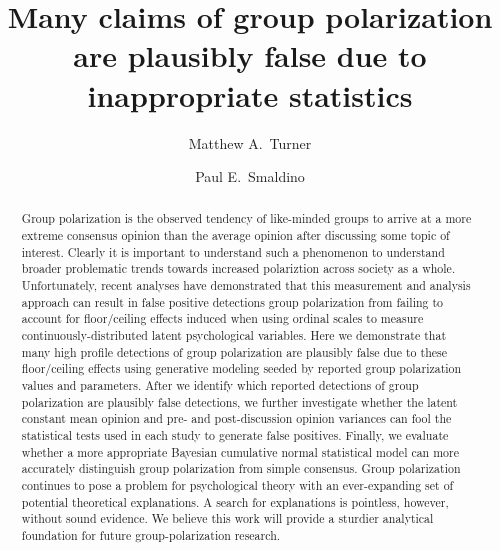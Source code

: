 \documentclass[11pt, letterpaper]{article}
\begin{document}
\title{Many claims of group polarization are plausibly false due to inappropriate
    statistics}
\author[1,2]{{Matthew A.~Turner}}

\author[3,4,5]{{Paul E.~Smaldino}}



\maketitle


\linenumbers
\modulolinenumbers[3]

\begin{abstract}
  \noindent
  Group polarization is the observed tendency of
  like-minded groups to arrive at a more extreme consensus opinion than
  the average opinion after discussing some topic of interest.
  Clearly it is important to understand such a phenomenon to understand broader
  problematic trends towards increased polariztion across society as a whole.
  Unfortunately, recent analyses have demonstrated that this measurement and
  analysis approach can result in false positive detections group polarization
  from failing to account for floor/ceiling effects induced when using ordinal scales to
  measure continuously-distributed latent psychological variables. 
  Here we demonstrate that many high profile detections
  of group polarization are plausibly false
  due to these floor/ceiling effects using generative modeling seeded by 
  reported group polarization values and parameters. After we identify which
  reported detections of group polarization are plausibly false detections, we further
  investigate whether the latent constant mean opinion and pre- and post-discussion
  opinion variances can fool the statistical tests used in each study to 
  generate false positives. Finally, we evaluate whether a more appropriate
  Bayesian cumulative normal statistical model can more accurately distinguish
  group polarization from simple consensus. Group polarization continues to 
  pose a problem for psychological theory with an ever-expanding set of potential theoretical
  explanations. A search for explanations is pointless, however, without sound
  evidence. We believe this work will provide a sturdier analytical foundation for 
  future group-polarization research.
\end{abstract}
\clearpage
\end{document}
